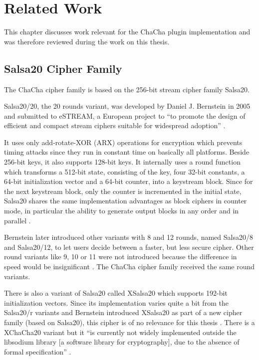 \chapter{Related Work}
\label{sec:relatedWork}

This chapter discusses work relevant for the ChaCha plugin implementation and was therefore reviewed during the work on this thesis.

\section{Salsa20 Cipher Family}
\label{sec:salsaCipher}

The ChaCha cipher family is based on the 256-bit stream cipher family Salsa20.

Salsa20/20, the 20 rounds variant, was developed by Daniel J. Bernstein in 2005 \cite{salsaspec} and submitted to eSTREAM, a European project to ``to promote the design of efficient and compact stream ciphers suitable for widespread adoption'' \cite{estream}.

It uses only add-rotate-XOR (ARX) operations for encryption which prevents timing attacks since they run in constant time on basically all platforms. Beside 256-bit keys, it also supports 128-bit keys. It internally uses a round function which transforms a 512-bit state, consisting of the key, four 32-bit constants, a 64-bit initialization vector and a 64-bit counter, into a keystream block. Since for the next keystream block, only the counter is incremented in the initial state, Salsa20 shares the same implementation advantages as block ciphers in counter mode, in particular the ability to generate output blocks in any order and in parallel \cite{salsaspec}.

Bernstein later introduced other variants with 8 and 12 rounds, named Salsa20/8 and Salsa20/12, to let users decide between a faster, but less secure cipher. Other round variants like 9, 10 or 11 were not introduced because the difference in speed would be insignificant \cite{salsa812}. The ChaCha cipher family received the same round variants. 

There is also a variant of Salsa20 called XSalsa20 which supports 192-bit initialization vectors. Since its implementation varies quite a bit from the Salsa20/r variants and Bernstein introduced XSalsa20 as part of a new cipher family (based on Salsa20), this cipher is of no relevance for this thesis \cite{xsalsa20spec}. There is a XChaCha20 variant but it ``is currently not widely implemented outside the libsodium library [a software library for cryptography], due to the absence of formal specification'' \cite{xchacha20}.

